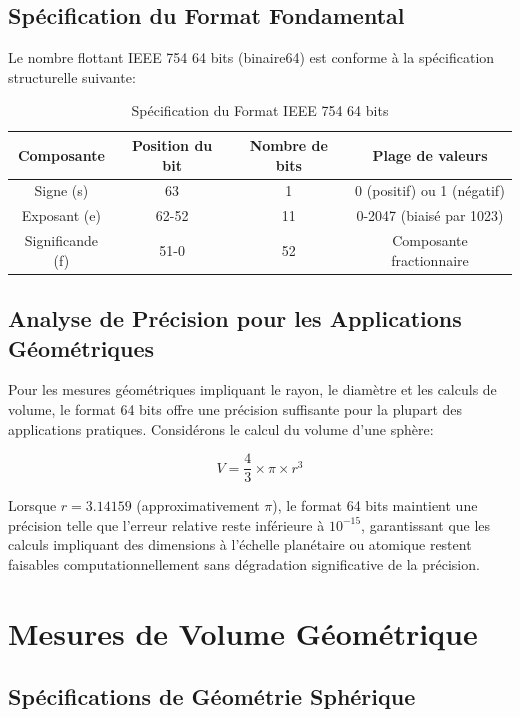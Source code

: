 \documentclass[12pt]{book}
\begin{document}
\section{Spécification du Format Fondamental}

Le nombre flottant IEEE 754 64 bits (binaire64) est conforme à la spécification structurelle suivante:

\begin{table}[h]
\centering
\begin{tabular}{|c|c|c|c|}
\hline
Composante & Position du bit & Nombre de bits & Plage de valeurs \\
\hline
Signe (s) & 63 & 1 & 0 (positif) ou 1 (négatif) \\
\hline
Exposant (e) & 62-52 & 11 & 0-2047 (biaisé par 1023) \\
\hline
Significande (f) & 51-0 & 52 & Composante fractionnaire \\
\hline
\end{tabular}
\caption{Spécification du Format IEEE 754 64 bits}
\end{table}

\section{Analyse de Précision pour les Applications Géométriques}

Pour les mesures géométriques impliquant le rayon, le diamètre et les calculs de volume, le format 64 bits offre une précision suffisante pour la plupart des applications pratiques. Considérons le calcul du volume d'une sphère:

\begin{equation}
\label{eq:sphere_volume}
V = \frac{4}{3} \times \pi \times r^3
\end{equation}

Lorsque $r = 3.14159$ (approximativement $\pi$), le format 64 bits maintient une précision telle que l'erreur relative reste inférieure à $10^{-15}$, garantissant que les calculs impliquant des dimensions à l'échelle planétaire ou atomique restent faisables computationnellement sans dégradation significative de la précision.

\chapter{Mesures de Volume Géométrique}

\section{Spécifications de Géométrie Sphérique}
\end{document}
